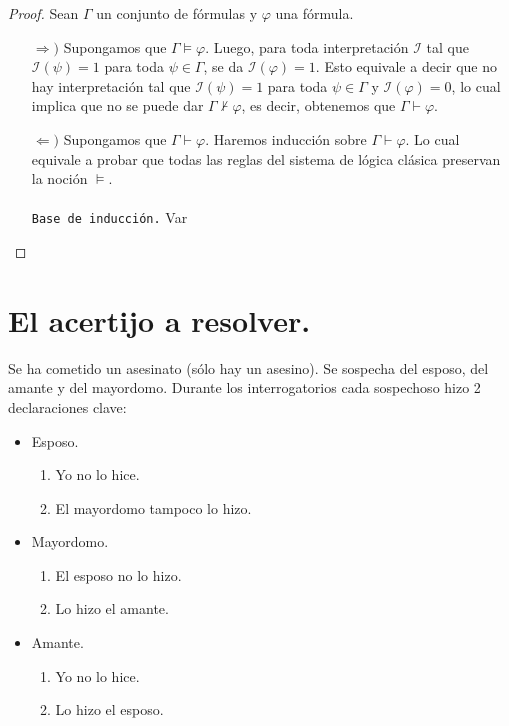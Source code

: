 \documentclass[letterpaper,12pt]{article}
\begin{document}
    \begin{proof}
        Sean $\Gamma$ un conjunto de fórmulas y $\varphi$ una fórmula.
        \begin{itemize}
            \item[$\Rightarrow )$] Supongamos que $\Gamma \models \varphi$.
            Luego, para toda interpretación $\mathcal{I}$ tal que 
            $\mathcal{I}(\psi) = 1$ para toda $\psi \in \Gamma$, se da
            $\mathcal{I}(\varphi) = 1$. Esto equivale a decir que no hay 
            interpretación tal que $\mathcal{I}(\psi) = 1$ para toda 
            $\psi \in \Gamma$ y $\mathcal{I}(\varphi) = 0$, lo cual 
            implica que no se puede dar $\Gamma \not \vdash \varphi$, 
            es decir, obtenemos que $\Gamma \vdash \varphi$.

            \item[$\Leftarrow )$] Supongamos que $\Gamma \vdash \varphi$.
            Haremos inducción sobre $\Gamma \vdash \varphi$. Lo cual 
            equivale a probar que todas las reglas del sistema de lógica 
            clásica preservan la noción $\models$. \\ \\
            \texttt{Base de inducción.} Var 
        \end{itemize}
    \end{proof}

    \section{El acertijo a resolver.}
    Se ha cometido un asesinato (sólo hay un asesino). Se sospecha del esposo,
    del amante y del mayordomo. Durante los interrogatorios cada sospechoso 
    hizo 2 declaraciones clave:
    \begin{itemize}
        \item Esposo.
        \begin{enumerate}
            \item Yo no lo hice.
            \item El mayordomo tampoco lo hizo.
        \end{enumerate}
        \item Mayordomo.
        \begin{enumerate}
            \item El esposo no lo hizo.
            \item Lo hizo el amante.
        \end{enumerate}
        \item Amante.
        \begin{enumerate}
            \item Yo no lo hice.
            \item Lo hizo el esposo.
        \end{enumerate}
    \end{itemize}
\end{document}

